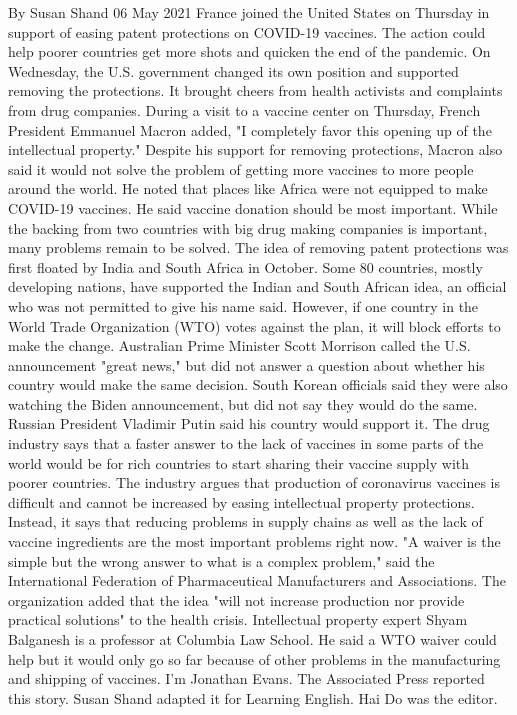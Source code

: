 By Susan Shand
06 May 2021
France joined the United States on Thursday in support of easing patent protections on COVID-19 vaccines. The action could help poorer countries get more shots and quicken the end of the pandemic.
On Wednesday, the U.S. government changed its own position and supported removing the protections. It brought cheers from health activists and complaints from drug companies.
During a visit to a vaccine center on Thursday, French President Emmanuel Macron added, "I completely favor this opening up of the intellectual property."
Despite his support for removing protections, Macron also said it would not solve the problem of getting more vaccines to more people around the world. He noted that places like Africa were not equipped to make COVID-19 vaccines. He said vaccine donation should be most important.
While the backing from two countries with big drug making companies is important, many problems remain to be solved.
The idea of removing patent protections was first floated by India and South Africa in October.
Some 80 countries, mostly developing nations, have supported the Indian and South African idea, an official who was not permitted to give his name said.
However, if one country in the World Trade Organization (WTO) votes against the plan, it will block efforts to make the change.
Australian Prime Minister Scott Morrison called the U.S. announcement "great news," but did not answer a question about whether his country would make the same decision. South Korean officials said they were also watching the Biden announcement, but did not say they would do the same.
Russian President Vladimir Putin said his country would support it.
The drug industry says that a faster answer to the lack of vaccines in some parts of the world would be for rich countries to start sharing their vaccine supply with poorer countries.
The industry argues that production of coronavirus vaccines is difficult and cannot be increased by easing intellectual property protections. Instead, it says that reducing problems in supply chains as well as the lack of vaccine ingredients are the most important problems right now.
"A waiver is the simple but the wrong answer to what is a complex problem," said the International Federation of Pharmaceutical Manufacturers and Associations. The organization added that the idea "will not increase production nor provide practical solutions" to the health crisis.
Intellectual property expert Shyam Balganesh is a professor at Columbia Law School. He said a WTO waiver could help but it would only go so far because of other problems in the manufacturing and shipping of vaccines.
I'm Jonathan Evans.
The Associated Press reported this story. Susan Shand adapted it for Learning English. Hai Do was the editor.

